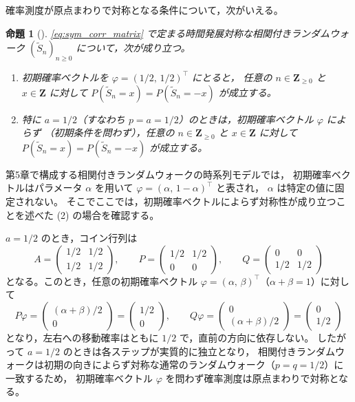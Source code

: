 \documentclass[a4j,dvipdfmx]{jsarticle}
\theoremstyle{plainnote}
\newtheorem{proposition}[theorem]{命題}
\begin{document}
確率測度が原点まわりで対称となる条件について，次がいえる。

\begin{proposition}[{\cite{ref1}}]
\label{prop:symmetry}
\eqref{eq:sym_corr_matrix} で定まる時間発展対称な相関付きランダムウォーク $(\tilde{S}_n)_{n \geq 0}$ について，次が成り立つ。
\begin{enumerate}
  \item 初期確率ベクトルを $\varphi = (1/2,\,1/2)^\top$ にとると，
        任意の $n \in \mathbf{Z}_{\geq 0}$ と $x \in \mathbf{Z}$ に対して
        $P(\tilde{S}_n = x) = P(\tilde{S}_n = -x)$ が成立する。
  \item 特に $a = 1/2$（すなわち $p = a = 1/2$）のときは，初期確率ベクトル $\varphi$ によらず
        （初期条件を問わず），任意の $n \in \mathbf{Z}_{\geq 0}$ と $x \in \mathbf{Z}$ に対して
        $P(\tilde{S}_n = x) = P(\tilde{S}_n = -x)$ が成立する。
\end{enumerate}
\end{proposition}

第5章で構成する相関付きランダムウォークの時系列モデルでは，
初期確率ベクトルはパラメータ $\alpha$ を用いて
$\varphi = (\alpha,\,1-\alpha)^\top$ と表され，
$\alpha$ は特定の値に固定されない。
そこでここでは，初期確率ベクトルによらず対称性が成り立つことを述べた
(2) の場合を確認する。

$a = 1/2$ のとき，コイン行列は
\[
  A = \begin{pmatrix} 1/2 & 1/2 \\ 1/2 & 1/2 \end{pmatrix}, \qquad
  P = \begin{pmatrix} 1/2 & 1/2 \\ 0 & 0 \end{pmatrix}, \qquad
  Q = \begin{pmatrix} 0 & 0 \\ 1/2 & 1/2 \end{pmatrix}
\]
となる。このとき，任意の初期確率ベクトル $\varphi = (\alpha,\,\beta)^\top$（$\alpha + \beta = 1$）に対して
\[
  P\varphi = \begin{pmatrix} (\alpha+\beta)/2 \\ 0 \end{pmatrix} = \begin{pmatrix} 1/2 \\ 0 \end{pmatrix}, \qquad
  Q\varphi = \begin{pmatrix} 0 \\ (\alpha+\beta)/2 \end{pmatrix} = \begin{pmatrix} 0 \\ 1/2 \end{pmatrix}
\]
となり，左右への移動確率はともに $1/2$ で，直前の方向に依存しない。
したがって $a = 1/2$ のときは各ステップが実質的に独立となり，
相関付きランダムウォークは初期の向きによらず対称な通常のランダムウォーク（$p=q=1/2$）に一致するため，
初期確率ベクトル $\varphi$ を問わず確率測度は原点まわりで対称となる。
\end{document}
